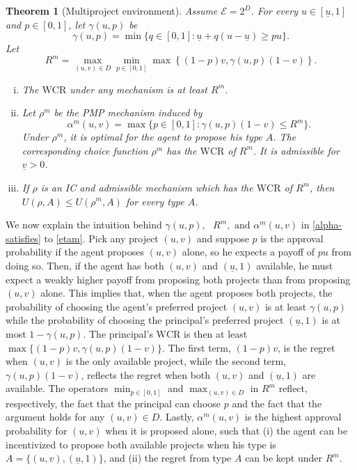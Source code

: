 \documentclass[12pt,english]{article}
\newcommand{\cale}{\mathcal E}
\newcommand{\under}{\underline}
\newcommand{\underu}{{\underline{u}}}
\theoremstyle{remark}
\theoremstyle{plain}
\newtheorem{theorem}{Theorem}[section]
\theoremstyle{definition}
\newcommand{\wcr}{\mathrm{WCR}}
\begin{document}
 \begin{theorem}[Multiproject environment]\label{th:multiproject}
Assume $\cale=2^D$. For every $u\in [\under u,1]$ and $p\in [0, 1]$, let $\gamma(u,p)$ be 
\begin{equation}
\label{alpha-satisfies}	
\gamma(u,p)=\min \{ q \in [0,1]: \underu+q(u-\underu) \geqslant p u\}.
\end{equation}
 Let 
     \begin{equation}
     \label{regretm}
     R^m = \max_{(u,v)\in D}\min_{p\in [0,1]}\max \left\{(1-p)v, \gamma(u,p)(1-v)\right\}.     	
     \end{equation}
\begin{enumerate}[(i)]
\vspace{-0.35cm} \item The $\wcr$ under any mechanism is at least $R^m$. 
\vspace{-0.35cm} \item Let $\rho^m$ be the PMP mechanism induced by 
    \begin{equation}\label{etam}\alpha^m(u,v)=\max\{p\in [0,1]: \gamma(u,p)(1-v)\leqslant R^m\}. \end{equation}
    Under $\rho^m$, it is optimal for the agent to propose his type $A$. The corresponding choice function $\rho^m$ has the $\wcr$ of $R^m$. It is admissible for $\under v>0$.
  \vspace{-0.35cm}  \item \label{multithree} If $\rho$ is an IC and admissible mechanism which has the $\wcr$ of $R^m$, then $U(\rho,A)\leqslant U(\rho^m,A)$ for every type $A$.
\end{enumerate}
\end{theorem}
We now explain the intuition behind $\gamma(u,p),\text{ } R^m, \text{ and }\alpha^m(u,v)$ in \eqref{alpha-satisfies} to \eqref{etam}. Pick any project $(u,v)$ and suppose $p$ is the approval probability if the agent proposes $(u,v)$ alone, so he expects a payoff of $pu$ from doing so. Then, if the agent has both $(u,v)$ and $(\underu,1)$ available, he must expect a weakly higher payoff from proposing both projects than from proposing $(u,v)$ alone. This implies that, when the agent proposes both projects, the probability of choosing the agent's preferred project $(u,v)$ is at least $\gamma (u,p)$ while the probability of choosing the principal's preferred project $(\underu,1)$ is at most $1-\gamma(u,p)$. %
The principal's $\wcr$ is then at least $\max\{(1-p)v, \gamma(u,p)(1-v) \}$. The first term, $(1-p)v$, is the regret when $(u,v)$ is the only available project, while the second term, $\gamma(u,p)(1-v)$, reflects the regret when both $(u,v)$ and $(\underu,1)$ are available. The operators $\min_{p\in[0,1]}$ and $\max_{(u,v) \in D}$ in $R^m$ reflect, respectively, the fact that the principal can choose $p$ and the fact that the argument holds for any $(u,v)\in D$. Lastly, $\alpha^m(u,v)$ is the highest approval probability for $(u,v)$ when it is proposed alone, such that (i) the agent can be incentivized to propose both available projects when his type is $A=\{(u,v),(\underu,1)\}$, and (ii) the regret from type $A$ can be kept under $R^m$.
\end{document}
